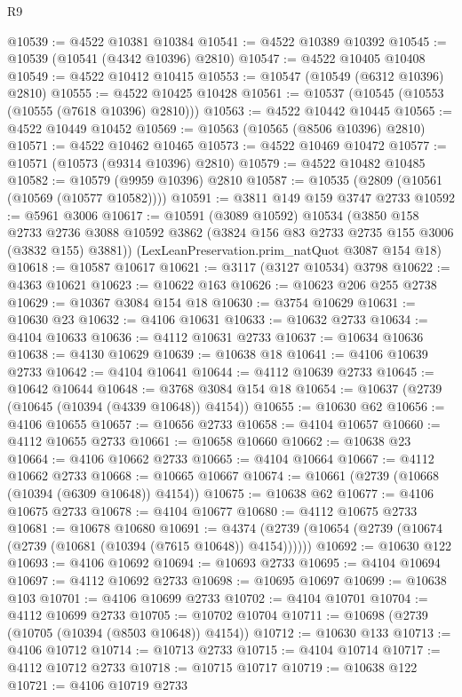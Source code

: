 \begin{lexlean}{R9}
\begin{coremodule}
@10539 := @4522 @10381 @10384
@10541 := @4522 @10389 @10392
@10545 := @10539 (@10541 (@4342 @10396) @2810)
@10547 := @4522 @10405 @10408
@10549 := @4522 @10412 @10415
@10553 := @10547 (@10549 (@6312 @10396) @2810)
@10555 := @4522 @10425 @10428
@10561 := @10537 (@10545 (@10553 (@10555 (@7618 @10396) @2810)))
@10563 := @4522 @10442 @10445
@10565 := @4522 @10449 @10452
@10569 := @10563 (@10565 (@8506 @10396) @2810)
@10571 := @4522 @10462 @10465
@10573 := @4522 @10469 @10472
@10577 := @10571 (@10573 (@9314 @10396) @2810)
@10579 := @4522 @10482 @10485
@10582 := @10579 (@9959 @10396) @2810
@10587 := @10535 (@2809 (@10561 (@10569 (@10577 @10582))))
@10591 := @3811 @149 @159 @3747 @2733
@10592 := @5961 @3006
@10617 := @10591
    (@3089 @10592)
    @10534
    (@3850
      @158
      @2733
      @2736
      @3088
      @10592
      @3862
      (@3824 @156 @83 @2733 @2735 @155 @3006 (@3832 @155) @3881))
    (LexLeanPreservation.prim_natQuot @3087 @154 @18)
@10618 := @10587 @10617
@10621 := @3117 (@3127 @10534) @3798
@10622 := @4363 @10621
@10623 := @10622 @163
@10626 := @10623 @206 @255 @2738
@10629 := @10367 @3084 @154 @18
@10630 := @3754 @10629
@10631 := @10630 @23
@10632 := @4106 @10631
@10633 := @10632 @2733
@10634 := @4104 @10633
@10636 := @4112 @10631 @2733
@10637 := @10634 @10636
@10638 := @4130 @10629
@10639 := @10638 @18
@10641 := @4106 @10639 @2733
@10642 := @4104 @10641
@10644 := @4112 @10639 @2733
@10645 := @10642 @10644
@10648 := @3768 @3084 @154 @18
@10654 := @10637 (@2739 (@10645 (@10394 (@4339 @10648)) @4154))
@10655 := @10630 @62
@10656 := @4106 @10655
@10657 := @10656 @2733
@10658 := @4104 @10657
@10660 := @4112 @10655 @2733
@10661 := @10658 @10660
@10662 := @10638 @23
@10664 := @4106 @10662 @2733
@10665 := @4104 @10664
@10667 := @4112 @10662 @2733
@10668 := @10665 @10667
@10674 := @10661 (@2739 (@10668 (@10394 (@6309 @10648)) @4154))
@10675 := @10638 @62
@10677 := @4106 @10675 @2733
@10678 := @4104 @10677
@10680 := @4112 @10675 @2733
@10681 := @10678 @10680
@10691 := @4374 (@2739 (@10654 (@2739 (@10674 (@2739 (@10681 (@10394 (@7615 @10648)) @4154))))))
@10692 := @10630 @122
@10693 := @4106 @10692
@10694 := @10693 @2733
@10695 := @4104 @10694
@10697 := @4112 @10692 @2733
@10698 := @10695 @10697
@10699 := @10638 @103
@10701 := @4106 @10699 @2733
@10702 := @4104 @10701
@10704 := @4112 @10699 @2733
@10705 := @10702 @10704
@10711 := @10698 (@2739 (@10705 (@10394 (@8503 @10648)) @4154))
@10712 := @10630 @133
@10713 := @4106 @10712
@10714 := @10713 @2733
@10715 := @4104 @10714
@10717 := @4112 @10712 @2733
@10718 := @10715 @10717
@10719 := @10638 @122
@10721 := @4106 @10719 @2733

\end{coremodule}
\end{lexlean}
